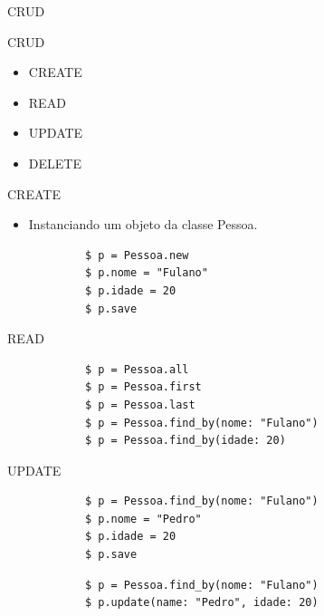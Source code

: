 \documentclass{beamer}
\begin{document}

\begin{frame}[fragile]{CRUD}
	\begin{block} {\LARGE CRUD}
		\begin{itemize} \itemsep 2em
			\item{\LARGE CREATE}
			\item{\LARGE READ}
			\item{\LARGE UPDATE}
			\item{\LARGE DELETE}				
		\end{itemize}
	\end{block}
\end{frame}

\begin{frame}[fragile]{CREATE}
\begin{itemize} \itemsep 2em
\item{\Large Instanciando um objeto da classe Pessoa.}
\end{itemize}
	\begin{block}{}
			\begin{verbatim}			
			$ p = Pessoa.new
			$ p.nome = "Fulano"
			$ p.idade = 20
			$ p.save
			\end{verbatim}
			\end{block}
\end{frame}

\begin{frame}[fragile]{READ }
	\begin{block}{}
			\begin{verbatim}			
			$ p = Pessoa.all
			$ p = Pessoa.first
			$ p = Pessoa.last
			$ p = Pessoa.find_by(nome: "Fulano")
			$ p = Pessoa.find_by(idade: 20)
			\end{verbatim}
			\end{block}
\end{frame}

\begin{frame}[fragile]{UPDATE}
	\begin{block}{}
			\begin{verbatim}			
			$ p = Pessoa.find_by(nome: "Fulano")
			$ p.nome = "Pedro"
			$ p.idade = 20
			$ p.save
			\end{verbatim}
			\end{block}
			\begin{block}{}
			\begin{verbatim}
			$ p = Pessoa.find_by(nome: "Fulano")
			$ p.update(name: "Pedro", idade: 20)
			\end{verbatim}
			\end{block}
\end{frame}
\end{document}
